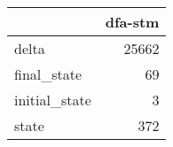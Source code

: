 \begin{tabular}{lr}
\toprule
{} &  dfa-stm \\
\midrule
delta         &    25662 \\
final\_state   &       69 \\
initial\_state &        3 \\
state         &      372 \\
\bottomrule
\end{tabular}
